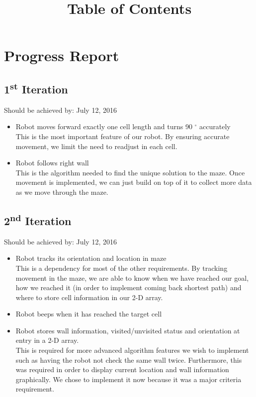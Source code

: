 \documentclass[11pt]{article}
\date{}
\title{Table of Contents}
\newcommand{\ts}{\textsuperscript}
\begin{document}
\maketitle

\tableofcontents

\newpage

\listoffigures

\newpage


\section{Progress Report}
\subsection{1\ts{st} Iteration}
Should be achieved by: July 12, 2016
\begin{itemize}
\item Robot moves forward exactly one cell length and turns 90 $^{\circ}$ accurately\\
This is the most important feature of our robot. By ensuring accurate movement, we limit the need to readjust in each cell.
\item Robot follows right wall\\
This is the algorithm needed to find the unique solution to the maze. Once movement is implemented, we can just build on top of it to collect more data as we move through the maze. 
\end{itemize}

\subsection{2\ts{nd} Iteration}
Should be achieved by: July 12, 2016
\begin{itemize}
\item Robot tracks its orientation and location in maze\\
This is a dependency for most of the other requirements. By tracking movement in the maze, we are able to know when we have reached our goal, how we reached it (in order to implement coming back shortest path) and where to store cell information in our 2-D array.
\item Robot beeps when it has reached the target cell
\item Robot stores wall information, visited/unvisited status and orientation at entry in a 2-D array.\\
This is required for more advanced algorithm features we wish to implement such as having the robot not check the same wall twice. Furthermore, this was required in order to display current location and wall information graphically. We chose to implement it now because it was a major criteria requirement. 
\end{itemize}
\end{document}
